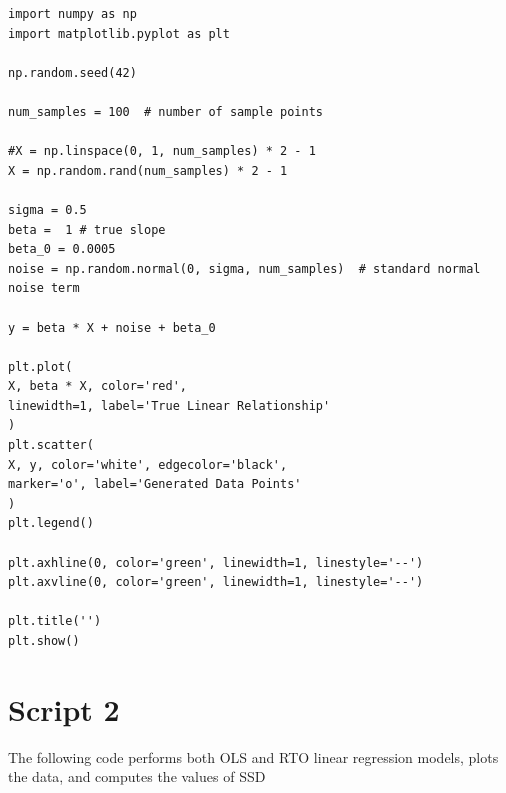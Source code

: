 \documentclass[12pt,a4paper,oneside]{book} %
\begin{document}
\begin{mdframed}[linecolor=black, topline=true, bottomline=true,
	leftline=false, rightline=false, backgroundcolor=yellow!20!white]
\begin{verbatim}
import numpy as np
import matplotlib.pyplot as plt

np.random.seed(42)

num_samples = 100  # number of sample points

#X = np.linspace(0, 1, num_samples) * 2 - 1
X = np.random.rand(num_samples) * 2 - 1

sigma = 0.5
beta =  1 # true slope
beta_0 = 0.0005
noise = np.random.normal(0, sigma, num_samples)  # standard normal noise term

y = beta * X + noise + beta_0

plt.plot(
X, beta * X, color='red', 
linewidth=1, label='True Linear Relationship'
)
plt.scatter(
X, y, color='white', edgecolor='black', 
marker='o', label='Generated Data Points'
)
plt.legend()

plt.axhline(0, color='green', linewidth=1, linestyle='--')
plt.axvline(0, color='green', linewidth=1, linestyle='--')

plt.title('')
plt.show()
\end{verbatim}
\end{mdframed}


\section{Script 2}

The following code performs both OLS and RTO linear regression models, plots the data, and computes the values of SSD
\end{document}
